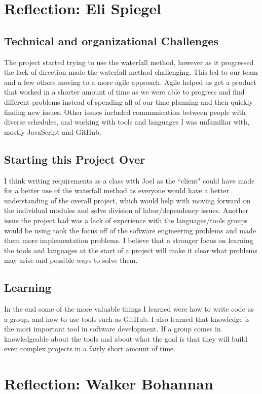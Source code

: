 \documentclass[a4paper]{article}
\begin{document}
\section{Reflection: Eli Spiegel}
\subsection{Technical and organizational Challenges}
The project started trying to use the waterfall method, however as it progressed the lack of direction made the waterfall method challenging. This led to our team and a few others moving to a more agile approach. Agile helped us get a product that worked in a shorter amount of time as we were able to progress and find different problems instead of spending all of our time planning and then quickly finding new issues. Other issues included communication between people with diverse schedules, and working with tools and languages I was unfamiliar with, mostly JavaScript and GitHub.
\subsection{Starting this Project Over}
I think writing requirements as a class with Joel as the ``client" could have made for a better use of the waterfall method as everyone would have a better understanding of the overall project, which would help with moving forward on the individual modules and solve division of labor/dependency issues. Another issue the project had was a lack of experience with the languages/tools groups would be using took the focus off of the software engineering problems and made them more implementation problems. I believe that a stronger focus on learning the tools and languages at the start of a project will make it clear what problems may arise and possible ways to solve them. 
\subsection{Learning}
In the end some of the more valuable things I learned were how to write code as a group, and how to use tools such as GitHub. I also learned that knowledge is the most important tool in software development. If a group comes in knowledgeable about the tools and about what the goal is that they will build even complex projects in a fairly short amount of time.
\section{Reflection: Walker Bohannan}
\end{document}
